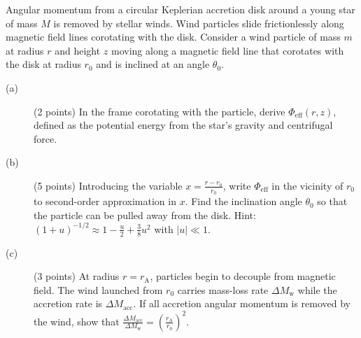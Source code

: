 Angular momentum from a circular Keplerian accretion disk around a young star
of mass $M$ is removed by stellar winds. Wind particles slide frictionlessly
along magnetic field lines corotating with the disk. Consider a wind particle
of mass $m$ at radius $r$ and height $z$ moving along a magnetic field line
that corotates with the disk at radius $r_0$ and is inclined at an angle
$\theta_0$.


\begin{description}
\item[(a)] (2 points) In the frame corotating with the particle, derive
  $\Phi_{\mathrm{eff}}(r, z)$, defined as the potential energy from the
  star's gravity and centrifugal force.
\item[(b)] (5 points) Introducing the variable $x = \frac{r - r_0}{r_0}$,
  write $\Phi_{\mathrm{eff}}$ in the vicinity of $r_0$ to second-order
  approximation in $x$. Find the inclination angle $\theta_0$ so that the
  particle can be pulled away from the disk. Hint:
  $(1 + u)^{-1/2} \approx 1 - \frac{u}{2} + \frac{3}{8}u^2$ with
  $|u| \ll 1$.
\item[(c)] (3 points) At radius $r = r_{\mathrm{A}}$, particles begin to
  decouple from magnetic field. The wind launched from $r_0$ carries
  mass-loss rate $\Delta M_{\mathrm{w}}$ while the accretion rate is
  $\Delta M_{\mathrm{acc}}$. If all accretion angular momentum is removed by
  the wind, show that
  $\frac{\Delta M_{\mathrm{acc}}}{\Delta M_{\mathrm{w}}}
   = \left(\frac{r_{\mathrm{A}}}{r_0}\right)^2$.
\end{description}
